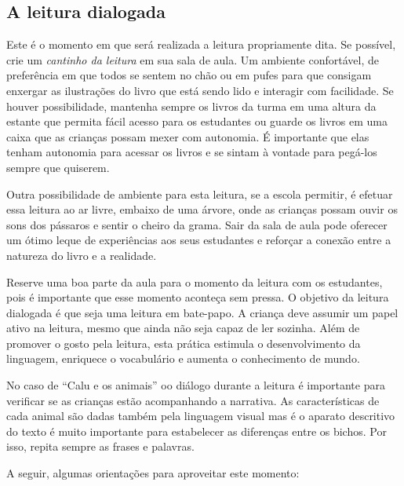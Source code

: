 \documentclass[11pt]{extarticle}
\begin{document}
\subsection{A leitura dialogada}
Este é o momento em que será realizada a leitura propriamente dita. 
Se possível, crie um \textit{cantinho da leitura} em sua sala de aula. Um 
ambiente confortável, de preferência em que todos se sentem no chão ou 
em pufes para que consigam enxergar as ilustrações do livro que está 
sendo lido e interagir com facilidade. Se houver possibilidade, mantenha 
sempre os livros da turma em uma altura da estante que permita fácil 
acesso para os estudantes ou guarde os livros em uma caixa que as crianças 
possam mexer com autonomia. É importante que elas tenham autonomia para 
acessar os livros e se sintam à vontade para pegá-los sempre que quiserem. 


Outra possibilidade de ambiente para esta leitura, se a escola permitir, 
é efetuar essa leitura ao ar livre, embaixo de uma árvore, onde as crianças 
possam ouvir os sons dos pássaros e sentir o cheiro da grama. Sair da sala 
de aula pode oferecer um ótimo leque de experiências aos seus estudantes e 
reforçar a conexão entre a natureza do livro e a realidade.  

Reserve uma boa parte da aula para o momento da leitura com os estudantes, 
pois é importante que esse momento aconteça sem pressa. O objetivo da 
leitura dialogada é que seja uma leitura em bate-papo. A criança deve 
assumir um papel ativo na leitura, mesmo que ainda não seja capaz de 
ler sozinha. Além de promover o gosto pela leitura, esta prática estimula 
o desenvolvimento da linguagem, enriquece o vocabulário e 
aumenta o conhecimento de mundo.

No caso de “Calu e os animais” oo diálogo durante a leitura
é importante para verificar se as crianças estão acompanhando
a narrativa. As características de cada animal são dadas
também pela linguagem visual mas é o aparato descritivo do
texto é muito importante para estabelecer as diferenças
entre os bichos. Por isso, repita sempre as frases e palavras.

A seguir, algumas orientações para aproveitar este momento: 
\end{document}
